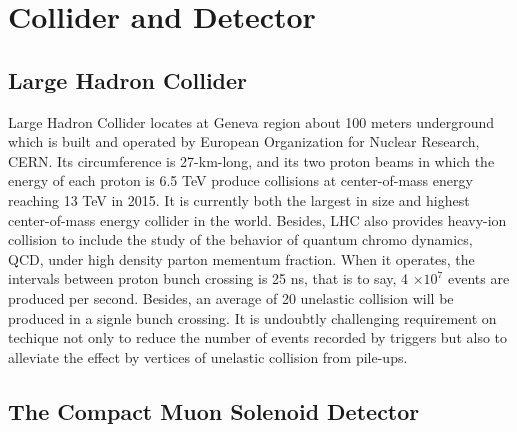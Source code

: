 
\chapter{Collider and Detector} \label{chap:2}

\section{Large Hadron Collider}%
Large Hadron Collider locates at Geneva region about 100 meters underground which is built and operated by European Organization for Nuclear Research, CERN. 
Its circumference is 27-km-long, and its two proton beams in which the energy of each proton is 6.5 TeV produce collisions at center-of-mass energy reaching 13 TeV in 2015. 
It is currently both the largest in size and highest center-of-mass energy collider in the world.
Besides, LHC also provides heavy-ion collision to include the study of the behavior of quantum chromo dynamics, QCD, under high density parton mementum fraction. 
When it operates, the intervals between proton bunch crossing is 25 ns, that is to say,  4 $\times 10^7$ events are produced per second. 
Besides, an average of 20 unelastic collision will be produced in a signle bunch crossing.
It is undoubtly challenging requirement on techique not only to reduce the number of events recorded by triggers but also to alleviate the effect by vertices of unelastic collision from pile-ups.

\section{The Compact Muon Solenoid Detector}

